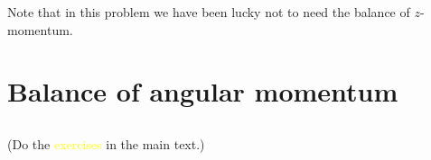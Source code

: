 \documentclass[a4paper,12pt,%
onecolumn,oneside,%
british%
]{memoir}
\renewcommand*{\|}[1][]{\nonscript\:#1\vert\nonscript\:\mathopen{}}
\begin{document}
\medskip

Note that in this problem we have been lucky not to need the balance of $z$-momentum.

















\printpagenotes*
\cleartooddpage
\chapter{Balance of angular momentum}
\label{cha:bal_ang_momentum}
\setcounter{section}{-1}

\section{}
(Do the \textcolor{yellow}{exercises} in the main text.)
\end{document}
